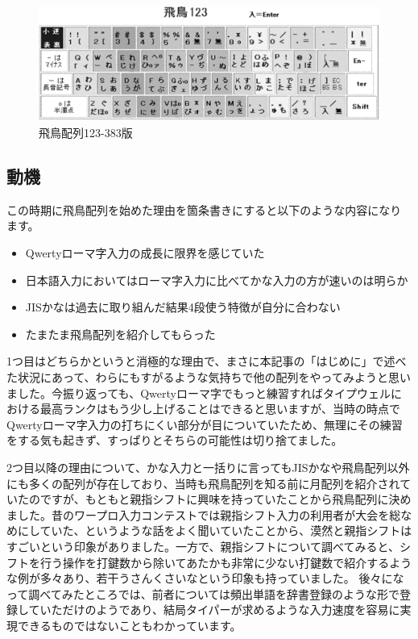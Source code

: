 \begin{figure}
 \begin{center}
   \includegraphics[width=14cm,clip]{res_tomoemon/asuka.eps}
 \end{center}
 \caption{飛鳥配列123-383版}
 \label{asuka}
\end{figure}

\subsection{動機}

この時期に飛鳥配列を始めた理由を箇条書きにすると以下のような内容になります。
\begin{itemize}
 \item Qwertyローマ字入力の成長に限界を感じていた
 \item 日本語入力においてはローマ字入力に比べてかな入力の方が速いのは明らか
 \item JISかなは過去に取り組んだ結果4段使う特徴が自分に合わない
 \item たまたま飛鳥配列を紹介してもらった
\end{itemize}
1つ目はどちらかというと消極的な理由で、まさに本記事の「はじめに」で述べた状況にあって、わらにもすがるような気持ちで他の配列をやってみようと思いました。今振り返っても、Qwertyローマ字でもっと練習すればタイプウェルにおける最高ランクはもう少し上げることはできると思いますが、当時の時点でQwertyローマ字入力の打ちにくい部分が目についていたため、無理にその練習をする気も起きず、すっぱりとそちらの可能性は切り捨てました。

2つ目以降の理由について、かな入力と一括りに言ってもJISかなや飛鳥配列以外にも多くの配列が存在しており、当時も飛鳥配列を知る前に月配列を紹介されていたのですが、もともと親指シフトに興味を持っていたことから飛鳥配列に決めました。昔のワープロ入力コンテストでは親指シフト入力の利用者が大会を総なめにしていた、というような話をよく聞いていたことから、漠然と親指シフトはすごいという印象がありました。一方で、親指シフトについて調べてみると、シフトを行う操作を打鍵数から除いてあたかも非常に少ない打鍵数で紹介するような例が多々あり、若干うさんくさいなという印象も持っていました。
後々になって調べてみたところでは、前者については頻出単語を辞書登録のような形で登録していただけのようであり、結局タイパーが求めるような入力速度を容易に実現できるものではないこともわかっています。

